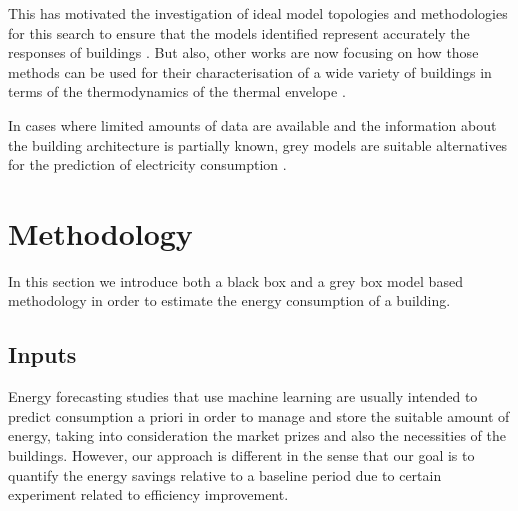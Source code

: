 \documentclass[10pt, conference, compsocconf]{IEEEtran}
\begin{document}
This has motivated the investigation of ideal model topologies and methodologies for this search to ensure that the models identified represent accurately the responses of buildings \cite{bacher2011identifying}. But also, other works are now focusing on how those methods can be used for their characterisation of a wide variety of buildings in terms of the thermodynamics of the thermal envelope \cite{ramallo2017reliability}.

In cases where limited amounts of data are available and the information about the building architecture is partially known, grey models are suitable alternatives for the prediction of electricity consumption \cite{hamzacebi2014forecasting}.












\section{Methodology}

In this section we introduce both a black box and a grey box model based methodology in order to estimate the energy consumption of a building.

\subsection{Inputs}


Energy forecasting studies that use machine learning are usually intended to predict consumption a priori in order to manage and store the suitable amount of energy, taking into consideration the market prizes and also the necessities of the buildings. However, our approach is different in the sense that our goal is to quantify the energy savings relative to a baseline period due to certain experiment related to efficiency improvement. 
\end{document}
